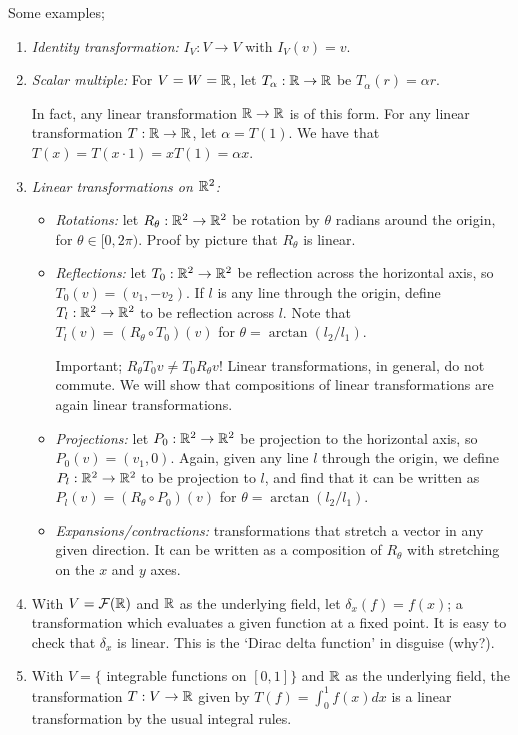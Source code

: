 Some examples;
\begin{enumerate}[{Ex. }A)]
  \item \emph{Identity transformation:} $I_V:V\to V$ with $I_V(v)=v$.
  \item \emph{Scalar multiple:} For $V=W=\mathbb{R}$, let $T_\alpha:\mathbb{R}\to\mathbb{R}$ be $T_\alpha(r)=\alpha r$.

  In fact, any linear transformation $\mathbb{R}\to\mathbb{R}$ is of this form. For any linear transformation $T:\mathbb{R}\to\mathbb{R}$, let $\alpha=T(1)$. We have that $T(x)=T(x\cdot 1) = x T(1)=\alpha x$.

  \item \emph{Linear transformations on $\mathbb{R}^2$:}
  \begin{itemize}
    \item \emph{Rotations:} let $R_\theta:\mathbb{R}^2\to\mathbb{R}^2$ be rotation by $\theta$ radians around the origin, for $\theta\in[0,2\pi)$. Proof by picture that $R_\theta$ is linear.

    \item \emph{Reflections:} let $T_0:\mathbb{R}^2\to\mathbb{R}^2$ be reflection across the horizontal axis, so $T_0(v)=(v_1,-v_2)$. If $l$ is any line through the origin, define $T_l:\mathbb{R}^2\to\mathbb{R}^2$ to be reflection across $l$. Note that $T_l(v)=(R_\theta\circ T_0)(v)$ for $\theta=\arctan(l_2/l_1)$.

    Important; $R_\theta T_0v \neq T_0 R_\theta v$! Linear transformations, in general, do not commute. We will show that compositions of linear transformations are again linear transformations.

    \item \emph{Projections:} let $P_0:\mathbb{R}^2\to\mathbb{R}^2$ be projection to the horizontal axis, so $P_0(v)=(v_1,0)$. Again, given any line $l$ through the origin, we define $P_l:\mathbb{R}^2\to\mathbb{R}^2$ to be projection to $l$, and find that it can be written as $P_l(v)=(R_\theta\circ P_0)(v)$ for $\theta=\arctan(l_2/l_1)$.

    \item \emph{Expansions/contractions:} transformations that stretch a vector in any given direction. It can be written as a composition of $R_\theta$ with stretching on the $x$ and $y$ axes.
  \end{itemize}

  \item With $V=\mathcal{F}(\mathbb{R})$ and $\mathbb{R}$ as the underlying field, let $\delta_x(f)=f(x)$; a transformation which evaluates a given function at a fixed point. It is easy to check that $\delta_x$ is linear. This is the `Dirac delta function' in disguise (why?).

  \item With $V=\{$ integrable functions on $[0,1]\}$ and $\mathbb{R}$ as the underlying field, the transformation $T:V\to\mathbb{R}$ given by $T(f)=\int_0^1 f(x)dx$ is a linear transformation by the usual integral rules.
\end{enumerate}

